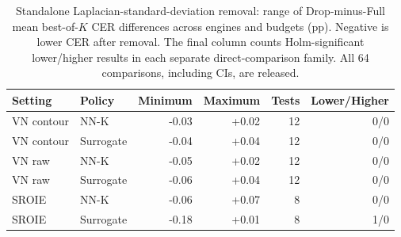 \begin{table}[htbp]
\centering\small
\caption{Standalone Laplacian-standard-deviation removal: range of Drop-minus-Full mean best-of-$K$ CER differences across engines and budgets (pp). Negative is lower CER after removal. The final column counts Holm-significant lower/higher results in each separate direct-comparison family. All 64 comparisons, including CIs, are released.}
\label{tab:noise_direct_ranges}
\begin{tabular}{llrrrr}\toprule
Setting & Policy & Minimum & Maximum & Tests & Lower/Higher \\\midrule
VN contour & NN-K & -0.03 & +0.02 & 12 & 0/0 \\
VN contour & Surrogate & -0.04 & +0.04 & 12 & 0/0 \\
VN raw & NN-K & -0.05 & +0.02 & 12 & 0/0 \\
VN raw & Surrogate & -0.06 & +0.04 & 12 & 0/0 \\
SROIE & NN-K & -0.06 & +0.07 & 8 & 0/0 \\
SROIE & Surrogate & -0.18 & +0.01 & 8 & 1/0 \\
\bottomrule\end{tabular}\end{table}

